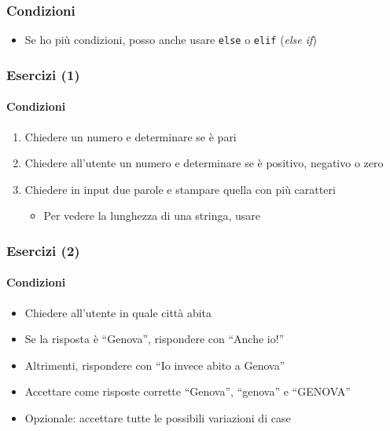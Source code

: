 \begin{contentframe}
    \frametitle{Condizioni}

    \begin{itemize}
        \item Se ho più condizioni, posso anche usare \texttt{else} o \texttt{elif} (\textit{else if})
    \end{itemize}

    \bigskip
    \centering
    
\end{contentframe}

\begin{exerciseframe}
    \frametitle{Esercizi (1)}
    \framesubtitle{Condizioni}

    \begin{enumerate}
        \item Chiedere un numero e determinare se è pari

        \bigskip
        \item Chiedere all'utente un numero e determinare se è positivo, negativo o zero

        \bigskip
        \item Chiedere in input due parole e stampare quella con più caratteri
        \begin{itemize}
            \item Per vedere la lunghezza di una stringa, usare 
        \end{itemize}
    \end{enumerate}
\end{exerciseframe}


\begin{exerciseframe}
    \frametitle{Esercizi (2)}
    \framesubtitle{Condizioni}

    \begin{itemize}
        \item Chiedere all'utente in quale città abita
        \item Se la risposta è ``Genova'', rispondere con ``Anche io!''
        \item Altrimenti, rispondere con ``Io invece abito a Genova''

        \pause
        \bigskip
        \item Accettare come risposte corrette ``Genova'', ``genova'' e ``GENOVA''
        
        \pause
        \bigskip
        \item Opzionale: accettare tutte le possibili variazioni di case
    \end{itemize}
\end{exerciseframe}

